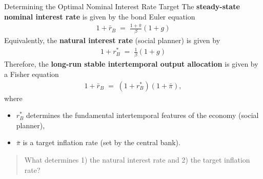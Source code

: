 \documentclass[10pt,c,aspectratio=1610,handout]{beamer}
\begin{document}
\begin{frame}{Determining the Optimal Nominal Interest Rate Target}%
  The \textbf{steady-state nominal interest rate} is given by the bond Euler equation%
  \begin{align*}%
    1+\bar{r}_B \; = \; \frac{1+\bar{\pi}}{\beta} \left(1+g\right)%
  \end{align*}%
  \pause%
  Equivalently, the \textbf{natural interest rate} (social planner) is given by%
  \begin{align*}%
    1+r_B^* \; = \; \frac{1}{\beta} \left(1+g\right)%
  \end{align*}%
  \pause%
  Therefore, the \textbf{long-run stable intertemporal output allocation} is given by a Fisher equation%
  \begin{align*}%
    1+\bar{r}_B \; = \; \left(1+r_B^*\right) \left(1+\bar{\pi}\right),%
  \end{align*}%
  where%
  \begin{itemize}%
    \item[$\rightarrow$] $r_B^*$ determines the fundamental intertemporal features of the economy (social planner),%
    \item[$\rightarrow$] $\bar{\pi}$ is a target inflation rate (set by the central bank).%
  \end{itemize}%
  \vspace*{0.3in}%
  \begin{quotation}%
    What determines 1) the natural interest rate and 2) the target inflation rate?%
  \end{quotation}%
\end{frame}%
\end{document}
